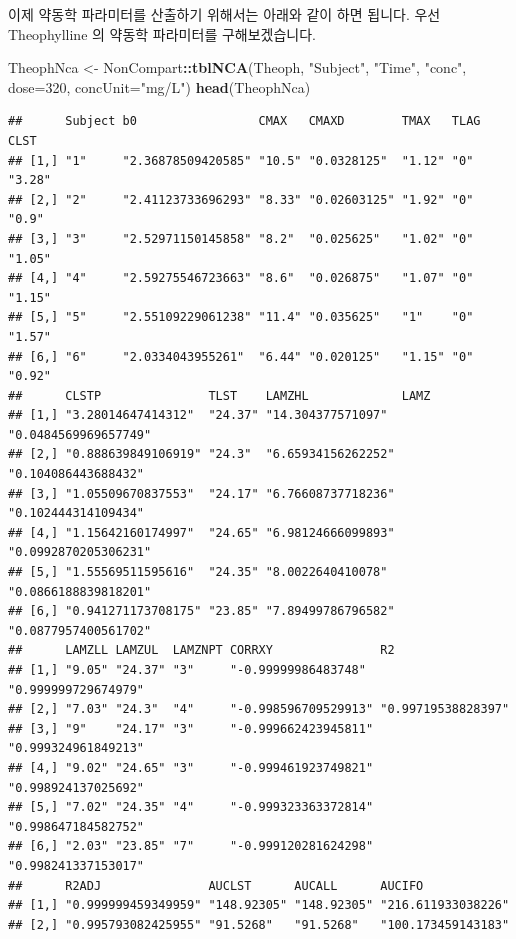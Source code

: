 \documentclass[12pt,]{krantz}
\newenvironment{Shaded}{\begin{snugshade}}{\end{snugshade}}
\newcommand{\KeywordTok}[1]{\textcolor[rgb]{0.13,0.29,0.53}{\textbf{#1}}}
\newcommand{\DataTypeTok}[1]{\textcolor[rgb]{0.13,0.29,0.53}{#1}}
\newcommand{\DecValTok}[1]{\textcolor[rgb]{0.00,0.00,0.81}{#1}}
\newcommand{\StringTok}[1]{\textcolor[rgb]{0.31,0.60,0.02}{#1}}
\newcommand{\OperatorTok}[1]{\textcolor[rgb]{0.81,0.36,0.00}{\textbf{#1}}}
\newcommand{\NormalTok}[1]{#1}
\theoremstyle{definition}
\theoremstyle{definition}
\theoremstyle{definition}
\theoremstyle{remark}
\begin{document}
이제 약동학 파라미터를 산출하기 위해서는 아래와 같이 하면 됩니다. 우선
Theophylline 의 약동학 파라미터를 구해보겠습니다.

\begin{Shaded}
\begin{Highlighting}[]
\NormalTok{TheophNca <-}\StringTok{ }\NormalTok{NonCompart}\OperatorTok{::}\KeywordTok{tblNCA}\NormalTok{(Theoph, }\StringTok{"Subject"}\NormalTok{, }\StringTok{"Time"}\NormalTok{, }\StringTok{"conc"}\NormalTok{, }\DataTypeTok{dose=}\DecValTok{320}\NormalTok{, }\DataTypeTok{concUnit=}\StringTok{"mg/L"}\NormalTok{)}
\KeywordTok{head}\NormalTok{(TheophNca)}
\end{Highlighting}
\end{Shaded}

\begin{verbatim}
##      Subject b0                 CMAX   CMAXD        TMAX   TLAG CLST  
## [1,] "1"     "2.36878509420585" "10.5" "0.0328125"  "1.12" "0"  "3.28"
## [2,] "2"     "2.41123733696293" "8.33" "0.02603125" "1.92" "0"  "0.9" 
## [3,] "3"     "2.52971150145858" "8.2"  "0.025625"   "1.02" "0"  "1.05"
## [4,] "4"     "2.59275546723663" "8.6"  "0.026875"   "1.07" "0"  "1.15"
## [5,] "5"     "2.55109229061238" "11.4" "0.035625"   "1"    "0"  "1.57"
## [6,] "6"     "2.0334043955261"  "6.44" "0.020125"   "1.15" "0"  "0.92"
##      CLSTP               TLST    LAMZHL             LAMZ                
## [1,] "3.28014647414312"  "24.37" "14.304377571097"  "0.0484569969657749"
## [2,] "0.888639849106919" "24.3"  "6.65934156262252" "0.104086443688432" 
## [3,] "1.05509670837553"  "24.17" "6.76608737718236" "0.102444314109434" 
## [4,] "1.15642160174997"  "24.65" "6.98124666099893" "0.0992870205306231"
## [5,] "1.55569511595616"  "24.35" "8.0022640410078"  "0.0866188839818201"
## [6,] "0.941271173708175" "23.85" "7.89499786796582" "0.0877957400561702"
##      LAMZLL LAMZUL  LAMZNPT CORRXY               R2                 
## [1,] "9.05" "24.37" "3"     "-0.99999986483748"  "0.999999729674979"
## [2,] "7.03" "24.3"  "4"     "-0.998596709529913" "0.99719538828397" 
## [3,] "9"    "24.17" "3"     "-0.999662423945811" "0.999324961849213"
## [4,] "9.02" "24.65" "3"     "-0.999461923749821" "0.998924137025692"
## [5,] "7.02" "24.35" "4"     "-0.999323363372814" "0.998647184582752"
## [6,] "2.03" "23.85" "7"     "-0.999120281624298" "0.998241337153017"
##      R2ADJ               AUCLST      AUCALL      AUCIFO            
## [1,] "0.999999459349959" "148.92305" "148.92305" "216.611933038226"
## [2,] "0.995793082425955" "91.5268"   "91.5268"   "100.173459143183"

\end{verbatim}
\end{document}
